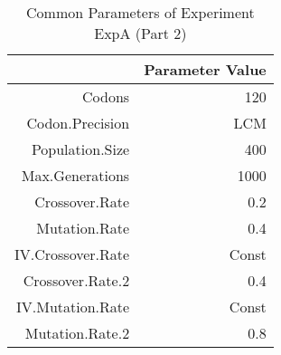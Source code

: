 \begin{table}[ht]
\centering
\begin{tabular}{rr}
  \hline
 & Parameter Value \\ 
  \hline
Codons & 120 \\ 
  Codon.Precision & LCM \\ 
  Population.Size & 400 \\ 
  Max.Generations & 1000 \\ 
  Crossover.Rate & 0.2 \\ 
  Mutation.Rate & 0.4 \\ 
  IV.Crossover.Rate & Const \\ 
  Crossover.Rate.2 & 0.4 \\ 
  IV.Mutation.Rate & Const \\ 
  Mutation.Rate.2 & 0.8 \\ 
   \hline
\end{tabular}
\caption{Common Parameters of Experiment ExpA (Part 2)} 
\end{table}
